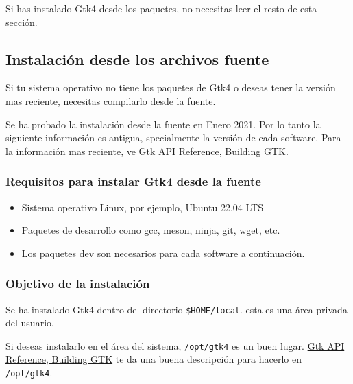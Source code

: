 Si has instalado Gtk4 desde los paquetes, no necesitas leer el resto de
esta sección.

\hypertarget{instalaciuxf3n-desde-los-archivos-fuente}{%
\subsection{Instalación desde los archivos
fuente}\label{instalaciuxf3n-desde-los-archivos-fuente}}

Si tu sistema operativo no tiene los paquetes de Gtk4 o deseas tener la
versión mas reciente, necesitas compilarlo desde la fuente.

Se ha probado la instalación desde la fuente en Enero 2021. Por lo tanto
la siguiente información es antigua, specialmente la versión de cada
software. Para la información mas reciente, ve
\href{https://docs.gtk.org/gtk4/building.html}{Gtk API Reference,
Building GTK}.

\hypertarget{requisitos-para-instalar-gtk4-desde-la-fuente}{%
\subsubsection{Requisitos para instalar Gtk4 desde la
fuente}\label{requisitos-para-instalar-gtk4-desde-la-fuente}}

\begin{itemize}
\tightlist
\item
  Sistema operativo Linux, por ejemplo, Ubuntu 22.04 LTS
\item
  Paquetes de desarrollo como gcc, meson, ninja, git, wget, etc.
\item
  Los paquetes dev son necesarios para cada software a continuación.
\end{itemize}

\hypertarget{objetivo-de-la-instalaciuxf3n}{%
\subsubsection{Objetivo de la
instalación}\label{objetivo-de-la-instalaciuxf3n}}

Se ha instalado Gtk4 dentro del directorio
\passthrough{\lstinline!$HOME/local!}. esta es una área privada del
usuario.

Si deseas instalarlo en el área del sistema,
\passthrough{\lstinline!/opt/gtk4!} es un buen lugar.
\href{https://docs.gtk.org/gtk4/building.html}{Gtk API Reference,
Building GTK} te da una buena descripción para hacerlo en
\passthrough{\lstinline!/opt/gtk4!}.

